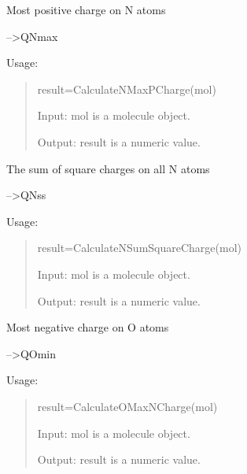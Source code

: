 \documentclass[letterpaper,10pt,english]{sphinxmanual}
\begin{document}

\begin{fulllineitems}
\label{reference/charge:charge.CalculateNMaxPCharge}
Most positive charge on N atoms

--\textgreater{}QNmax

Usage:
\begin{quote}

result=CalculateNMaxPCharge(mol)

Input: mol is a molecule object.

Output: result is a numeric value.
\end{quote}

\end{fulllineitems}


\begin{fulllineitems}
\label{reference/charge:charge.CalculateNSumSquareCharge}
The sum of square charges on all N atoms

--\textgreater{}QNss

Usage:
\begin{quote}

result=CalculateNSumSquareCharge(mol)

Input: mol is a molecule object.

Output: result is a numeric value.
\end{quote}

\end{fulllineitems}


\begin{fulllineitems}
\label{reference/charge:charge.CalculateOMaxNCharge}
Most negative charge on O atoms

--\textgreater{}QOmin

Usage:
\begin{quote}

result=CalculateOMaxNCharge(mol)

Input: mol is a molecule object.

Output: result is a numeric value.
\end{quote}

\end{fulllineitems}
\end{document}
